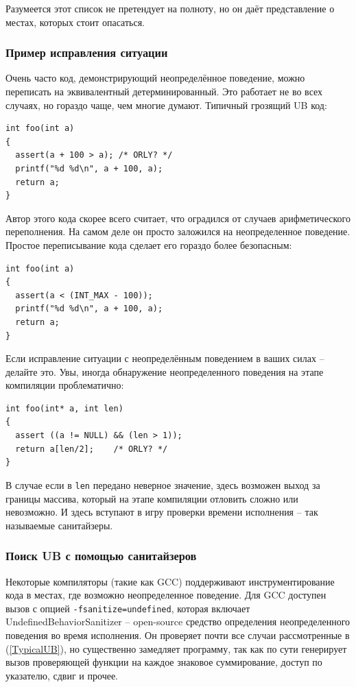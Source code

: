 \documentclass[a4paper,12pt,oneside]{article}
\begin{document}
Разумеется этот список не претендует на полноту, но он даёт представление о местах, которых стоит опасаться.

\subsubsection{Пример исправления ситуации}\label{CorrectingUB}

Очень часто код, демонстрирующий неопределённое поведение, можно переписать на эквивалентный детерминированный. Это работает не во всех случаях, но гораздо чаще, чем многие думают. Типичный грозящий UB код:

\begin{lstlisting}
int foo(int a) 
{
  assert(a + 100 > a); /* ORLY? */
  printf("%d %d\n", a + 100, a);
  return a;
}
\end{lstlisting}

Автор этого кода скорее всего считает, что оградился от случаев арифметического переполнения. На самом деле он просто заложился на неопределенное поведение. Простое переписывание кода сделает его гораздо более безопасным:

\begin{lstlisting}
int foo(int a) 
{
  assert(a < (INT_MAX - 100));
  printf("%d %d\n", a + 100, a);
  return a;
}
\end{lstlisting}

Если исправление ситуации с неопределённым поведением в ваших силах -- делайте это. Увы, иногда обнаружение неопределенного поведения на этапе компиляции проблематично:

\begin{lstlisting}
int foo(int* a, int len) 
{
  assert ((a != NULL) && (len > 1));
  return a[len/2];    /* ORLY? */
}
\end{lstlisting}

В случае если в \lstinline!len! передано неверное значение, здесь возможен выход за границы массива, который на этапе компиляции отловить сложно или невозможно. И здесь вступают в игру проверки времени исполнения -- так называемые санитайзеры.

\subsubsection{Поиск UB с помощью санитайзеров}\label{SanitizerUsage}

Некоторые компиляторы (такие как GCC) поддерживают инструментирование кода в местах, где возможно неопределенное поведение. Для GCC доступен вызов с опцией \lstinline!-fsanitize=undefined!, которая включает UndefinedBehaviorSanitizer -- open-source средство определения неопределенного поведения во время исполнения. Он проверяет почти все случаи рассмотренные в (\ref{TypicalUB}), но существенно замедляет программу, так как по сути генерирует вызов проверяющей функции на каждое знаковое суммирование, доступ по указателю, сдвиг и прочее.
\end{document}
